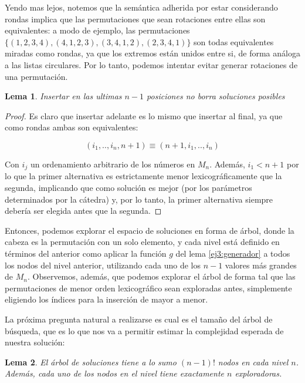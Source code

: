 \documentclass{article}
\newtheorem{lemma}{Lema}[theorem]
\theoremstyle{definition}
\theoremstyle{remark}
\begin{document}
Yendo mas lejos, notemos que la semántica adherida por estar considerando rondas implica que las permutaciones que sean rotaciones entre ellas son equivalentes: a modo de ejemplo, las permutaciones $\{(1, 2, 3, 4), (4, 1, 2, 3), (3, 4, 1, 2), (2, 3, 4, 1)\}$ son todas equivalentes miradas como rondas, ya que los extremos están unidos entre si, de forma análoga a las listas circulares. Por lo tanto, podemos intentar evitar generar rotaciones de una permutación.

\begin{lemma}
Insertar en las ultimas $n-1$ posiciones no borra soluciones posibles
\label{ej3:poda1}
\end{lemma}

\begin{proof}
Es claro que insertar adelante es lo mismo que insertar al final, ya que como rondas ambas son equivalentes:

$$(i_1, .., i_n, n+1) \equiv (n+1, i_1, .., i_n)$$

Con $i_j$ un ordenamiento arbitrario de los números en $M_n$. Además, $i_1 < n+1$ por lo que la primer alternativa es estrictamente menor lexicográficamente que la segunda, implicando que como solución es mejor (por los parámetros determinados por la cátedra) y, por lo tanto, la primer alternativa siempre debería ser elegida antes que la segunda.
\end{proof}

Entonces, podemos explorar el espacio de soluciones en forma de árbol, donde la cabeza es la permutación con un solo elemento, y cada nivel está definido en términos del anterior como aplicar la función $g$ del lema \ref{ej3:generador} a todos los nodos del nivel anterior, utilizando cada uno de los $n-1$ valores más grandes de $M_n$. Observemos, además, que podemos explorar el árbol de forma tal que las permutaciones de menor orden lexicográfico sean exploradas antes, simplemente eligiendo los índices para la inserción de mayor a menor.


La próxima pregunta natural a realizarse es cual es el tamaño del árbol de búsqueda, que es lo que nos va a permitir estimar la complejidad esperada de nuestra solución:

\begin{lemma}
El árbol de soluciones tiene a lo sumo $(n-1)!$ nodos en cada nivel $n$. Además, cada uno de los nodos en el nivel tiene exactamente $n$ exploradoras.
\label{ej3:arbol-nodos}
\end{lemma}
\end{document}
